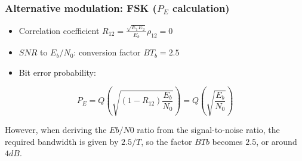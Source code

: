 \documentclass{beamer}
\begin{document}
\begin{frame}
	\frametitle{Alternative modulation: FSK ($P_E$ calculation)}
	\begin{itemize}
		\item Correlation coefficient $R_{12} = \frac{\sqrt{E_1 E_2}}{E_b}\rho_{12} = 0$
		\item $SNR$ to $E_b/N_0$: conversion factor $B T_b = 2.5$
		\item Bit error probability:
	\end{itemize}
	\begin{equation}
		P_E = Q\left(\sqrt{\left(1 - R_{12}\right) \frac{E_b}{N_0}}\right) = Q\left(\sqrt{\frac{E_b}{N_0}}\right)
	\end{equation}
	
However, when deriving the $Eb/N0$ ratio from the signal-to-noise ratio, the required bandwidth is given by $2.5/T$, so the factor $BTb$ becomes $2.5$, or around $4 dB$.
\end{frame}
\end{document}
